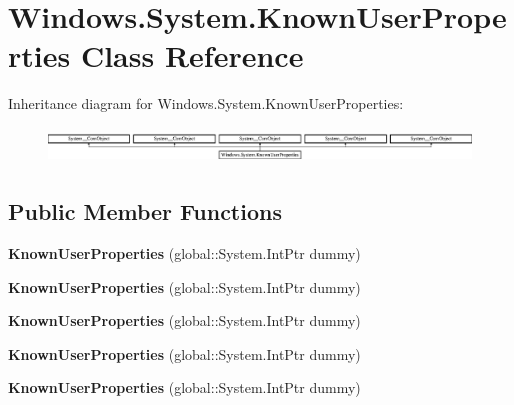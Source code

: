 \hypertarget{class_windows_1_1_system_1_1_known_user_properties}{}\section{Windows.\+System.\+Known\+User\+Properties Class Reference}
\label{class_windows_1_1_system_1_1_known_user_properties}
Inheritance diagram for Windows.\+System.\+Known\+User\+Properties\+:\begin{figure}[H]
\begin{center}
\leavevmode
\includegraphics[height=0.933333cm]{class_windows_1_1_system_1_1_known_user_properties}
\end{center}
\end{figure}
\subsection*{Public Member Functions}
\begin{DoxyCompactItemize}
\item 
\mbox{\label{class_windows_1_1_system_1_1_known_user_properties_a4e6d68bb6436aa806fc123230a1ea83c}} 
{\bfseries Known\+User\+Properties} (global\+::\+System.\+Int\+Ptr dummy)
\item 
\mbox{\label{class_windows_1_1_system_1_1_known_user_properties_a4e6d68bb6436aa806fc123230a1ea83c}} 
{\bfseries Known\+User\+Properties} (global\+::\+System.\+Int\+Ptr dummy)
\item 
\mbox{\label{class_windows_1_1_system_1_1_known_user_properties_a4e6d68bb6436aa806fc123230a1ea83c}} 
{\bfseries Known\+User\+Properties} (global\+::\+System.\+Int\+Ptr dummy)
\item 
\mbox{\label{class_windows_1_1_system_1_1_known_user_properties_a4e6d68bb6436aa806fc123230a1ea83c}} 
{\bfseries Known\+User\+Properties} (global\+::\+System.\+Int\+Ptr dummy)
\item 
\mbox{\label{class_windows_1_1_system_1_1_known_user_properties_a4e6d68bb6436aa806fc123230a1ea83c}} 
{\bfseries Known\+User\+Properties} (global\+::\+System.\+Int\+Ptr dummy)
\end{DoxyCompactItemize}
